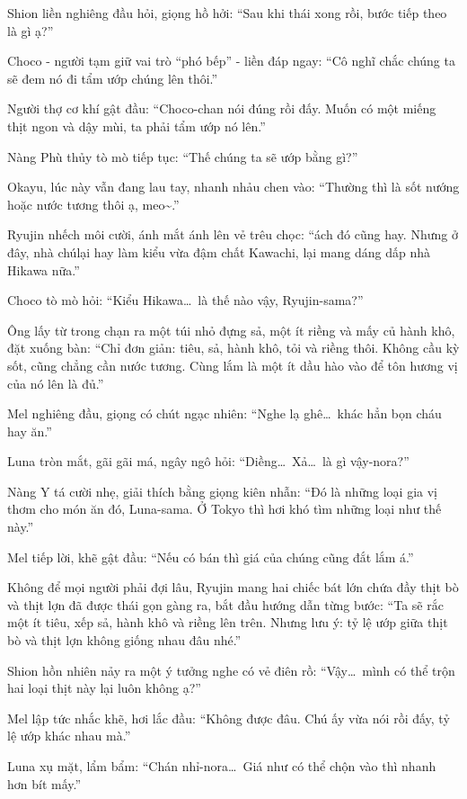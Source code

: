 \documentclass[../main.tex]{subfiles}
\begin{document}
Shion liền nghiêng đầu hỏi, giọng hồ hởi: ``Sau khi thái xong rồi, bước tiếp theo là gì ạ?''

Choco - người tạm giữ vai trò ``phó bếp'' - liền đáp ngay: ``Cô nghĩ chắc chúng ta sẽ đem nó đi tẩm ướp chúng lên thôi.''

Người thợ cơ khí gật đầu: ``Choco-chan nói đúng rồi đấy. Muốn có một miếng thịt ngon và dậy mùi, ta phải tẩm ướp nó lên.''

Nàng Phù thủy tò mò tiếp tục: ``Thế chúng ta sẽ ướp bằng gì?''

Okayu, lúc này vẫn đang lau tay, nhanh nhảu chen vào: ``Thường thì là sốt nướng hoặc nước tương thôi ạ, meo\~{}.''

Ryujin nhếch môi cười, ánh mắt ánh lên vẻ trêu chọc: ``ách đó cũng hay. Nhưng ở đây, nhà chúlại hay làm kiểu vừa đậm chất Kawachi, lại mang dáng dấp nhà Hikawa nữa.''

Choco tò mò hỏi: ``Kiểu Hikawa\dots\ là thế nào vậy, Ryujin-sama?''

Ông lấy từ trong chạn ra một túi nhỏ đựng sả, một ít riềng và mấy củ hành khô, đặt xuống bàn: ``Chỉ đơn giản: tiêu, sả, hành khô, tỏi và riềng thôi. Không cầu kỳ sốt, cũng chẳng cần nước tương. Cùng lắm là một ít dầu hào vào để tôn hương vị của nó lên là đủ.''

Mel nghiêng đầu, giọng có chút ngạc nhiên: ``Nghe lạ ghê\dots\ khác hẳn bọn cháu hay ăn.''

Luna tròn mắt, gãi gãi má, ngây ngô hỏi: ``Diềng\dots\ Xả\dots\ là gì vậy-nora?''

Nàng Y tá cười nhẹ, giải thích bằng giọng kiên nhẫn: ``Đó là những loại gia vị thơm cho món ăn đó, Luna-sama. Ở Tokyo thì hơi khó tìm những loại như thế này.''

Mel tiếp lời, khẽ gật đầu: ``Nếu có bán thì giá của chúng cũng đắt lắm á.''

Không để mọi người phải đợi lâu, Ryujin mang hai chiếc bát lớn chứa đầy thịt bò và thịt lợn đã được thái gọn gàng ra, bắt đầu hướng dẫn từng bước: ``Ta sẽ rắc một ít tiêu, xếp sả, hành khô và riềng lên trên. Nhưng lưu ý: tỷ lệ ướp giữa thịt bò và thịt lợn không giống nhau đâu nhé.''

Shion hồn nhiên nảy ra một ý tưởng nghe có vẻ điên rồ: ``Vậy\dots\ mình có thể trộn hai loại thịt này lại luôn không ạ?''

Mel lập tức nhắc khẽ, hơi lắc đầu: ``Không được đâu. Chú ấy vừa nói rồi đấy, tỷ lệ ướp khác nhau mà.''

Luna xụ mặt, lẩm bẩm: ``Chán nhỉ-nora\dots\ Giá như có thể chộn vào thì nhanh hơn bít mấy.''
\end{document}
